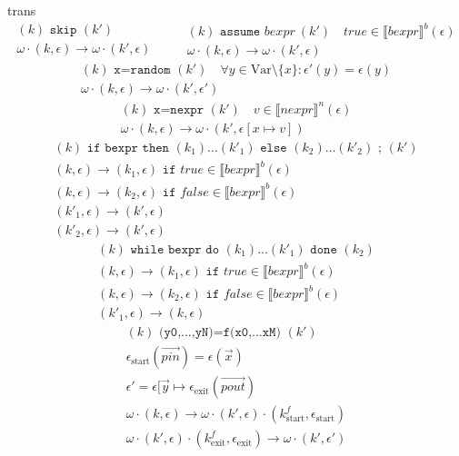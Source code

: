 \documentclass[a4paper,11pt]{article}
\newcommand{\sem}[1]{\llbracket #1 \rrbracket}
\begin{document}
\W\htmlonly{\begin{quote}}
\begin{image}{trans}
  $$
  \begin{array}{c}
    (k) \texttt{~skip~} (k') \\ \hline
    \omega\cdot (k,\epsilon) \rightarrow \omega\cdot (k',\epsilon)
  \end{array}
  \qquad
  \begin{array}{c}
    (k) \texttt{~assume~} bexpr ~ (k') \quad true\in\sem{bexpr}^b(\epsilon) \\ \hline
    \omega\cdot (k,\epsilon) \rightarrow \omega\cdot (k',\epsilon)
  \end{array}
  $$
  $$
  \begin{array}{c}
    (k) \texttt{~x=random~} (k') \quad \forall y\in\mathrm{Var}\setminus\{x\}:\epsilon'(y)=\epsilon(y) \\ \hline
    \omega\cdot (k,\epsilon) \rightarrow \omega\cdot (k',\epsilon')
  \end{array}
  $$
  $$
  \begin{array}{c}
    (k) \texttt{~x=nexpr~} (k') \quad v\in\sem{nexpr}^n(\epsilon)  \\ \hline
    \omega\cdot (k,\epsilon) \rightarrow \omega\cdot (k',\epsilon[x\mapsto v])
  \end{array}
  $$
  $$
  \begin{array}{c}
    (k) \texttt{~if bexpr then~} (k_1)\ldots(k'_1) \texttt{~else~} (k_2)\ldots (k'_2) \texttt{~;~} (k')\\ \hline
    (k,\epsilon) \rightarrow (k_1,\epsilon) \texttt{~if~} true\in\sem{bexpr}^b(\epsilon) \\
    (k,\epsilon) \rightarrow (k_2,\epsilon) \texttt{~if~} false\in\sem{bexpr}^b(\epsilon) \\
    (k'_1,\epsilon) \rightarrow (k',\epsilon) \\
    (k'_2,\epsilon) \rightarrow (k',\epsilon)
  \end{array}
  $$
  $$
  \begin{array}{c}
    (k) \texttt{~while bexpr do~} (k_1)\ldots(k'_1) \texttt{~done~} (k_2)\\ \hline
    (k,\epsilon) \rightarrow (k_1,\epsilon) \texttt{~if~} true\in\sem{bexpr}^b(\epsilon) \\
    (k,\epsilon) \rightarrow (k_2,\epsilon) \texttt{~if~} false\in\sem{bexpr}^b(\epsilon) \\
    (k'_1,\epsilon) \rightarrow (k,\epsilon)
  \end{array}
  $$
  $$
  \begin{array}{c}
    (k) \texttt{~(y0,...,yN)=f(x0,...xM)~} (k') \\
    \epsilon_\mathrm{start}(\vec{pin}) = \epsilon(\vec{x}) \\
    \epsilon' = \epsilon[\vec{y} \mapsto \epsilon_\mathrm{exit}(\vec{pout}) \\ \hline
    \omega\cdot (k,\epsilon) \rightarrow \omega\cdot (k',\epsilon) \cdot (k^f_\mathrm{start},\epsilon_\mathrm{start}) \\
     \omega\cdot (k',\epsilon) \cdot (k^f_\mathrm{exit},\epsilon_\mathrm{exit})
     \rightarrow
     \omega\cdot (k',\epsilon')
  \end{array}
  $$
\end{image}
\end{document}

